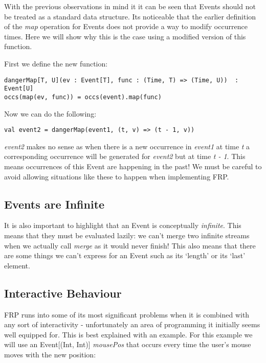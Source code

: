       With the previous observations in mind it it can be seen that Events should not be treated as a
      standard data structure. Its noticeable that the earlier definition of the \emph{map} operation for
      Events does not provide a way to modify occurrence times. Here we will show why this is
      the case using a modified version of this function.
      
      First we define the new function:
      
\begin{verbatim}
dangerMap[T, U](ev : Event[T], func : (Time, T) => (Time, U))  : Event[U]
occs(map(ev, func)) = occs(event).map(func)
\end{verbatim}

      Now we can do the following:
      
\begin{verbatim}
val event2 = dangerMap(event1, (t, v) => (t - 1, v))
\end{verbatim}

      \emph{event2} makes no sense as when there is a new occurrence in \emph{event1} at time 
      \emph{t} a corresponding occurrence will be generated for \emph{event2} but at time 
      \emph{t - 1}. This means occurrences of this Event are happening in the past! We must
      be careful to avoid allowing situations like these to happen when implementing FRP.
      
    \subsection{Events are Infinite}  
      It is also important to highlight that an Event is conceptually \emph{infinite}. This means
      that they must be evaluated lazily: we can't merge two infinite streams when we actually
      call \emph{merge} as it would never finish! This also means that there are some things we
      can't express for an Event such as its `length' or its `last' element.
    
      
    \subsection{Interactive Behaviour}
      FRP runs into some of its most significant problems when it is combined with any
      sort of interactivity - unfortunately an area of programming it initially seems
      well equipped for. This is best explained with an example. For this example we will use an 
      Event[(Int, Int)] \emph{mousePos} that occurs every time the user's mouse moves with the new position:

